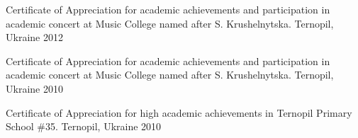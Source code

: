 \begin{cvhonors}
  \cvhonor
    {Certificate of Appreciation} %
    {for academic achievements and participation in academic concert at Music College named after S. Krushelnytska.} %
    {Ternopil, Ukraine} %
    {2012} %

  \cvhonor
    {Certificate of Appreciation} %
    {for academic achievements and participation in academic concert at Music College named after S. Krushelnytska.} %
    {Ternopil, Ukraine} %
    {2010} %

  \cvhonor
    {Certificate of Appreciation} %
    {for high academic achievements in Ternopil Primary School \#35.} %
    {Ternopil, Ukraine} %
    {2010} %

\end{cvhonors}
